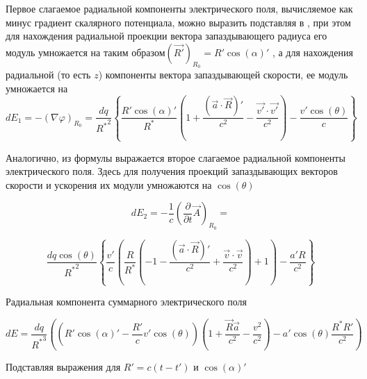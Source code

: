 ﻿\documentclass[12pt, letterpaper]{article}
\begin{document}
Первое слагаемое радиальной компоненты электрического поля, вычисляемое как минус градиент скалярного потенциала, можно выразить подставляя  в  , при этом для нахождения радиальной проекции вектора запаздывающего радиуса его модуль умножается на  таким образом${{\left( \overrightarrow{R'} \right)}_{{{R}_{0}}}}=R'\cos \left( \alpha  \right)'$ , а для нахождения радиальной (то есть $z$) компоненты вектора запаздывающей скорости, ее модуль умножается на 
	\[d{{E}_{1}}=-{{\left( \nabla \varphi  \right)}_{{{R}_{0}}}}=\frac{dq}{{{R}^{*}}^{2}}\left\{ \frac{R'\cos \left( \alpha  \right)'}{{{R}^{*}}}\left( 1+\frac{\left( \overrightarrow{a}\cdot \overrightarrow{R} \right)'}{{{c}^{2}}}-\frac{\overrightarrow{v'}\cdot \overrightarrow{v'}}{{{c}^{2}}} \right)-\frac{v'\cos \left( \theta  \right)}{c} \right\}\]

Аналогично, из формулы  выражается второе слагаемое радиальной компоненты электрического поля. Здесь для получения проекций запаздывающих векторов скорости и ускорения их модули умножаются на $\cos \left( \theta  \right)$

	\[d{{E}_{2}}=-\frac{1}{c}{{\left( \frac{\partial }{\partial t}\overrightarrow{A} \right)}_{{{R}_{0}}}}=\]

\[\frac{dq\cos \left( \theta  \right)}{{{R}^{*}}^{2}}\left\{ \frac{v'}{c}\left( \frac{R}{{{R}^{*}}}\left( -1-\frac{\left( \overrightarrow{a}\cdot \overrightarrow{R} \right)'}{{{c}^{2}}}+\frac{\overrightarrow{v}\cdot \overrightarrow{v}}{{{c}^{2}}} \right)+1 \right)-\frac{a'R}{{{c}^{2}}} \right\}\] 

Радиальная компонента суммарного электрического поля

$$dE = \frac{dq}{{{R}^{*}}^{3}} \left( \left({R'\cos \left( \alpha  \right)'}-\frac{R'}{c}{v'\cos \left( \theta  \right)} \right) \left(1 + \frac{\vec{R}\vec{a}}{c^2} - \frac{v^2}{c^2} \right) - {a' \cos \left( \theta  \right)}\frac{{R}^{*}R'}{c^2} \right)$$

 Подставляя выражения для $R'=c\left( t-t' \right)$ и $\cos \left( \alpha  \right)'$



\end{document}
